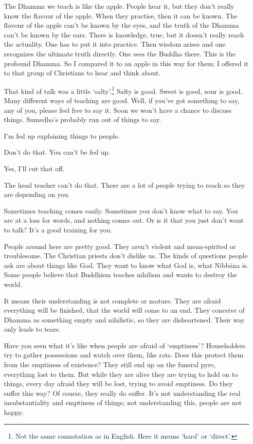 The Dhamma we teach is like the apple. People hear it, but they don't really know the flavour of the apple. When they practise, then it can be known. The flavour of the apple can't be known by the eyes, and the truth of the Dhamma can't be known by the ears. There is knowledge, true, but it doesn't really reach the actuality. One has to put it into practice. Then wisdom arises and one recognizes the ultimate truth directly. One sees the Buddha there. This is the profound Dhamma. So I compared it to an apple in this way for them; I offered it to that group of Christians to hear and think about.

That kind of talk was a little `salty'.\footnote{Not the same connotation as in English. Here it means `hard' or `direct'.} Salty is good. Sweet is good, sour is good. Many different ways of teaching are good. Well, if you've got something to say, any of you, please feel free to say it. Soon we won't have a chance to discuss things. Sumedho's probably run out of things to say.

 I'm fed up explaining things to people.

 Don't do that. You can't be fed up.

 Yes, I'll cut that off.

 The head teacher can't do that. There are a lot of people trying to reach  so they are depending on you.

Sometimes teaching comes easily. Sometimes you don't know what to say. You are at a loss for words, and nothing comes out. Or is it that you just don't want to talk? It's a good training for you.

 People around here are pretty good. They aren't violent and mean-spirited or troublesome. The Christian priests don't dislike us. The kinds of questions people ask are about things like God. They want to know what God is, what Nibb\=ana is. Some people believe that Buddhism teaches nihilism and wants to destroy the world.

 It means their understanding is not complete or mature. They are afraid everything will be finished, that the world will come to an end. They conceive of Dhamma as something empty and nihilistic, so they are disheartened. Their way only leads to tears.

Have you seen what it's like when people are afraid of `emptiness'? Householders try to gather possessions and watch over them, like rats. Does this protect them from the emptiness of existence? They still end up on the funeral pyre, everything lost to them. But while they are alive they are trying to hold on to things, every day afraid they will be lost, trying to avoid emptiness. Do they suffer this way? Of course, they really do suffer. It's not understanding the real insubstantiality and emptiness of things; not understanding this, people are not happy.

